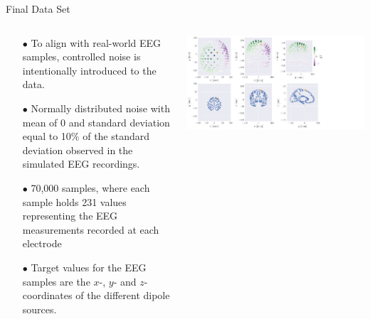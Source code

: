 \documentclass[aspectratio=169, 9pt]{beamer}
\begin{document}
\begin{frame}{Final Data Set}
  \begin{columns}
    \begin{column}{0.5\textwidth}
      \begin{itemize}
        \item[$\bullet$] To align with real-world EEG samples, controlled noise is intentionally introduced to the data.
        \item[$\bullet$] Normally distributed noise with mean of 0 and standard deviation equal to 10$\%$ of the standard deviation observed in the simulated EEG recordings.
        \item[$\bullet$] 70,000 samples, where each sample holds 231 values representing the EEG measurements recorded at each electrode
        \item[$\bullet$] Target values for the EEG samples are the $x$-, $y$- and $z$-coordinates of the different dipole sources.
      \end{itemize}
    \end{column}
    \begin{column}{0.5\textwidth}
      \includegraphics[width=1.0\textwidth]{figures/simple_example.pdf}
    \end{column}
  \end{columns}
\end{frame}
\end{document}
